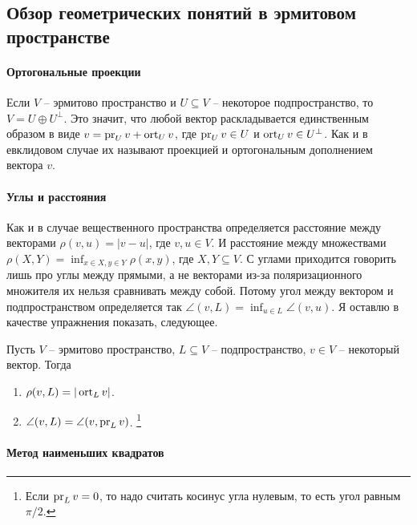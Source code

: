 \subsection{Обзор геометрических понятий в эрмитовом пространстве}

\paragraph{Ортогональные проекции}

Если $V$ -- эрмитово пространство и $U\subseteq V$ -- некоторое подпространство, то $V = U\oplus U^\bot$.
Это значит, что любой вектор раскладывается единственным образом в виде $v = \operatorname{pr}_U v + \operatorname{ort}_U v$, где $\operatorname{pr}_U v\in U$ и $\operatorname{ort}_U v \in U^\bot$.
Как и в евклидовом случае их называют проекцией и ортогональным дополнением вектора $v$.

\paragraph{Углы и расстояния}

Как и в случае вещественного пространства определяется расстояние между векторами $\rho(v,u) = |v - u|$, где $v,u\in V$.
И расстояние между множествами $\rho(X, Y) = \inf_{x\in X, y\in Y}\rho(x,y)$, где $X,Y\subseteq V$.
С углами приходится говорить лишь про углы между прямыми, а не векторами из-за поляризационного множителя их нельзя сравнивать между собой.
Потому угол между вектором и подпространством определяется так $\angle(v,L) = \inf_{u\in L}\angle(v,u)$.
Я оставлю в качестве упражнения показать, следующее.

\begin{claim}
\label{claim::DistAngleHerm}
Пусть $V$ -- эрмитово пространство, $L\subseteq V$ -- подпространство, $v\in V$ -- некоторый вектор.
Тогда
\begin{enumerate}
\item $\rho(v, L) = |\operatorname{ort}_L v|$.

\item $\angle(v, L) = \angle(v, \operatorname{pr}_L v)$.%
\footnote{Если $\operatorname{pr}_L v = 0$, то надо считать косинус угла нулевым, то есть угол равным $\pi/2$.}
\end{enumerate}
\end{claim}

\paragraph{Метод наименьших квадратов}

